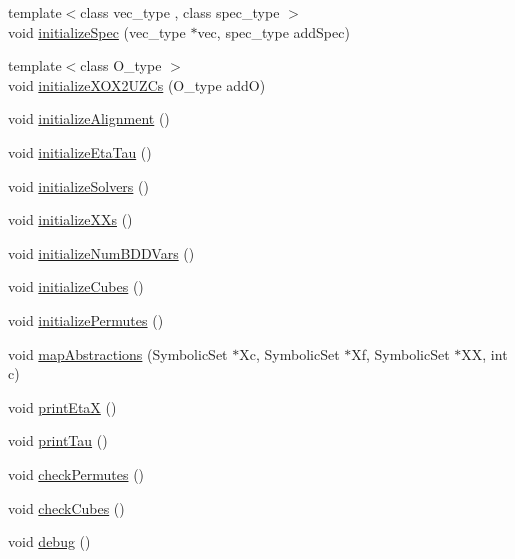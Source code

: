 \begin{DoxyCompactItemize}
\item 
{\footnotesize template$<$class vec\+\_\+type , class spec\+\_\+type $>$ }\\void \hyperlink{classscots_1_1Adaptive_aac25a2399ed09b07ef546579c94b0726}{initialize\+Spec} (vec\+\_\+type $\ast$vec, spec\+\_\+type add\+Spec)
\item 
{\footnotesize template$<$class O\+\_\+type $>$ }\\void \hyperlink{classscots_1_1Adaptive_a1ec108254af99302f1aa0c0c97389a2b}{initialize\+X\+O\+X2\+U\+Z\+Cs} (O\+\_\+type addO)
\item 
void \hyperlink{classscots_1_1Adaptive_a8f23922cbd2768a8339c73928ddc9c5a}{initialize\+Alignment} ()
\item 
void \hyperlink{classscots_1_1Adaptive_a655af3ff313bd74cca9896846d71680d}{initialize\+Eta\+Tau} ()
\item 
void \hyperlink{classscots_1_1Adaptive_ae560144f79da25ac086d5ac0589397a8}{initialize\+Solvers} ()
\item 
void \hyperlink{classscots_1_1Adaptive_af08ee7fae4cf6c5ae1fcabb8699e0721}{initialize\+X\+Xs} ()
\item 
void \hyperlink{classscots_1_1Adaptive_ab75f4bbed30ecc70747185f36fcab200}{initialize\+Num\+B\+D\+D\+Vars} ()
\item 
void \hyperlink{classscots_1_1Adaptive_a2b4a5e42c1a4fca883c132b02295bf11}{initialize\+Cubes} ()
\item 
void \hyperlink{classscots_1_1Adaptive_a7351461977b9be0f07ec2974531af677}{initialize\+Permutes} ()
\item 
void \hyperlink{classscots_1_1Adaptive_a5513d2aa66399f472082def1d8befced}{map\+Abstractions} (Symbolic\+Set $\ast$Xc, Symbolic\+Set $\ast$Xf, Symbolic\+Set $\ast$XX, int c)
\item 
void \hyperlink{classscots_1_1Adaptive_af192d9fee4a464e21d88b2d9735c5053}{print\+EtaX} ()
\item 
void \hyperlink{classscots_1_1Adaptive_a7e3c0b5babfb943dcda7f7f5c89cbb3e}{print\+Tau} ()
\item 
void \hyperlink{classscots_1_1Adaptive_aba179a9fad6056239005127af2e95f45}{check\+Permutes} ()
\item 
void \hyperlink{classscots_1_1Adaptive_a5e8e6dc690e2c800338fd2c866af8889}{check\+Cubes} ()
\item 
void \hyperlink{classscots_1_1Adaptive_a8ea5724cde577baf708496d6bef7e548}{debug} ()
\end{DoxyCompactItemize}
